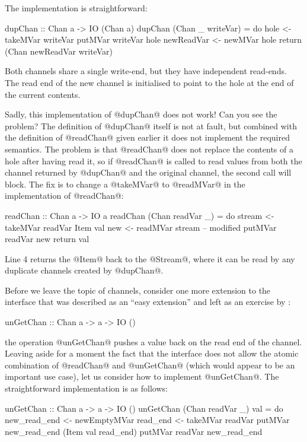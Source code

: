 The implementation is straightforward:

\begin{haskell}
dupChan :: Chan a -> IO (Chan a)
dupChan (Chan _ writeVar) = do
   hole       <- takeMVar writeVar
   putMVar writeVar hole
   newReadVar <- newMVar hole
   return (Chan newReadVar writeVar)
\end{haskell}

\noindent Both channels share a single write-end, but they have
independent read-ends.  The read end of the new channel is initialised
to point to the hole at the end of the current contents.

Sadly, this implementation of @dupChan@ does not work!  Can you see
the problem?  The definition of @dupChan@ itself is not at fault, but
combined with the definition of @readChan@ given earlier it does not
implement the required semantics.  The problem is that @readChan@ does
not replace the contents of a hole after having read it, so if
@readChan@ is called to read values from both the channel returned by
@dupChan@ and the original channel, the second call will block.  The fix is to change a
@takeMVar@ to @readMVar@ in the implementation of @readChan@:

\begin{numhaskell}
readChan :: Chan a -> IO a
readChan (Chan readVar _) = do
  stream <- takeMVar readVar
  Item val new <- readMVar stream -- modified
  putMVar readVar new
  return val
\end{numhaskell}

\noindent Line 4 returns the @Item@ back to the @Stream@, where it can
be read by any duplicate channels created by @dupChan@.

Before we leave the topic of channels, consider one more extension to
the interface that was described as an ``easy extension'' and left as
an exercise by \citet{jones96concurrent}:

\begin{haskell}
unGetChan :: Chan a -> a -> IO ()
\end{haskell}

\noindent the operation @unGetChan@ pushes a value back on the read
end of the channel.  Leaving aside for a moment the fact that the
interface does not allow the atomic combination of @readChan@ and
@unGetChan@ (which would appear to be an important use case), let us
consider how to implement @unGetChan@.  The straightforward
implementation is as follows:

\begin{numhaskell}
unGetChan :: Chan a -> a -> IO ()
unGetChan (Chan readVar _) val = do
   new_read_end <- newEmptyMVar
   read_end <- takeMVar readVar
   putMVar new_read_end (Item val read_end)
   putMVar readVar new_read_end
\end{numhaskell}

